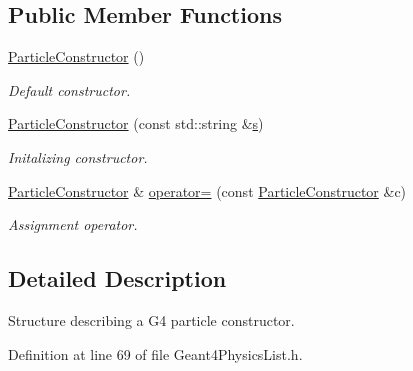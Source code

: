 \subsection*{Public Member Functions}
\begin{DoxyCompactItemize}
\item 
\hyperlink{class_d_d4hep_1_1_simulation_1_1_geant4_physics_list_1_1_particle_constructor_adba2d247dfc7585c62125d5f4284e8c0}{ParticleConstructor} ()
\begin{DoxyCompactList}\small\item\em Default constructor. \item\end{DoxyCompactList}\item 
\hyperlink{class_d_d4hep_1_1_simulation_1_1_geant4_physics_list_1_1_particle_constructor_a3c4a6b9ead0cd6c10487c07c3376931d}{ParticleConstructor} (const std::string \&\hyperlink{_volumes_8cpp_a17ca6bfc8040d695d3cada22a4763d40}{s})
\begin{DoxyCompactList}\small\item\em Initalizing constructor. \item\end{DoxyCompactList}\item 
\hyperlink{class_d_d4hep_1_1_simulation_1_1_geant4_physics_list_1_1_particle_constructor}{ParticleConstructor} \& \hyperlink{class_d_d4hep_1_1_simulation_1_1_geant4_physics_list_1_1_particle_constructor_a54d456bf5a4f13eeedeaefd879f4f1c8}{operator=} (const \hyperlink{class_d_d4hep_1_1_simulation_1_1_geant4_physics_list_1_1_particle_constructor}{ParticleConstructor} \&c)
\begin{DoxyCompactList}\small\item\em Assignment operator. \item\end{DoxyCompactList}\end{DoxyCompactItemize}


\subsection{Detailed Description}
Structure describing a G4 particle constructor. 

Definition at line 69 of file Geant4PhysicsList.h.

